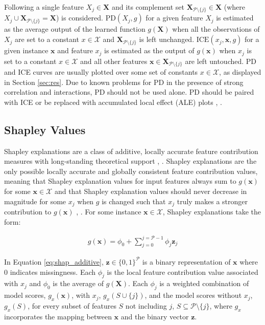 \documentclass[information,article,submit,moreauthors,pdftex]{definitions/mdpi}
\begin{document}
Following \citet{esl} a single feature $X_j \in \mathbf{X}$ and its complement set $\mathbf{X}_{\mathcal{P} \setminus \{j\}} \in \mathbf{X}$ (where $X_j \cup \mathbf{X}_{\mathcal{P} \setminus \{j\}} = \mathbf{X}$) is considered. $\text{PD}(X_j, g)$ for a given feature $X_j$ is estimated as the average output of the learned function $g(\mathbf{X})$ when all the observations of $X_j$ are set to a constant $x \in \mathcal{X}$ and $\mathbf{X}_{\mathcal{P} \setminus \{j\}}$ is left unchanged. $\text{ICE}(x_j, \mathbf{x}, g)$ for a given instance $\mathbf{x}$ and feature $x_j$ is estimated as the output of $g(\mathbf{x})$ when $x_j$ is set to a constant $x \in \mathcal{X}$ and all other features $\mathbf{x} \in \mathbf{X}_{\mathcal{P} \setminus \{j\}}$ are left untouched. PD and ICE curves are usually plotted over some set of constants $x \in \mathcal{X}$, as displayed in Section \ref{sec:res}. Due to known problems for PD in the presence of strong correlation and interactions, PD should not be used alone. PD should be paired with ICE or be replaced with accumulated local effect (ALE) plots \cite{ice_plots}, \cite{ale_plot}.

\subsection{Shapley Values}\label{ssec:shap}

Shapley explanations are a class of additive, locally accurate feature contribution measures with long-standing theoretical support \cite{shapley}, \cite{shapley1988shapley}. Shapley explanations are the only possible locally accurate and globally consistent feature contribution values, meaning that Shapley explanation values for input features always sum to $g(\mathbf{x})$ for some $\mathbf{x} \in \mathcal{X}$ and that Shapley explanation values should never decrease in magnitude for some $x_j$ when $g$ is changed such that $x_j$ truly makes a stronger contribution to $g(\mathbf{x})$ \cite{shapley}, \cite{tree_shap}. For some instance $\mathbf{x} \in \mathcal{X}$, Shapley explanations take the form: 

\begin{equation}
\label{eq:shap_additive}
\begin{aligned}
g(\mathbf{x}) = \phi_0 + \sum_{j=0}^{j=\mathcal{P} - 1} \phi_j \mathbf{z}_j
\end{aligned}
\end{equation}

\noindent In Equation \ref{eq:shap_additive}, $\mathbf{z} \in \{0,1\}^\mathcal{P}$ is a binary representation of $\mathbf{x}$ where 0 indicates missingness. Each $\phi_j$ is the local feature contribution value associated with $x_j$ and $\phi_0$ is the average of $g(\mathbf{X})$. Each $\phi_j$ is a weighted combination of model scores, $g_x(\mathbf{x})$, with $x_j$, $g_x(S \cup \{j\})$, and the model scores without $x_j$, $g_x(S)$, for every subset of features $S$ not including $j$, $S \subseteq \mathcal{P} \setminus \{j\}$, where $g_x$ incorporates the mapping between $\mathbf{x}$ and the binary vector $\mathbf{z}$. 
\end{document}
